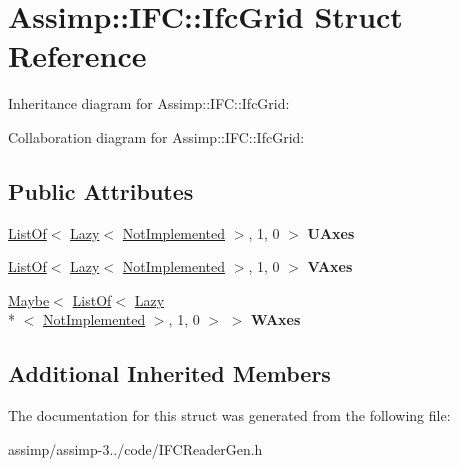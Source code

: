 \hypertarget{struct_assimp_1_1_i_f_c_1_1_ifc_grid}{\section{Assimp\+:\+:I\+F\+C\+:\+:Ifc\+Grid Struct Reference}
\label{struct_assimp_1_1_i_f_c_1_1_ifc_grid}
}


Inheritance diagram for Assimp\+:\+:I\+F\+C\+:\+:Ifc\+Grid\+:


Collaboration diagram for Assimp\+:\+:I\+F\+C\+:\+:Ifc\+Grid\+:
\subsection*{Public Attributes}
\begin{DoxyCompactItemize}
\item 
\hypertarget{struct_assimp_1_1_i_f_c_1_1_ifc_grid_a9d70c4ada02236992a3c54b2bcadb63d}{\hyperlink{struct_assimp_1_1_s_t_e_p_1_1_list_of}{List\+Of}$<$ \hyperlink{struct_assimp_1_1_s_t_e_p_1_1_lazy}{Lazy}$<$ \hyperlink{struct_assimp_1_1_i_f_c_1_1_not_implemented}{Not\+Implemented} $>$, 1, 0 $>$ {\bfseries U\+Axes}}\label{struct_assimp_1_1_i_f_c_1_1_ifc_grid_a9d70c4ada02236992a3c54b2bcadb63d}

\item 
\hypertarget{struct_assimp_1_1_i_f_c_1_1_ifc_grid_a9b6389c4440eca16eb23e5f198e71278}{\hyperlink{struct_assimp_1_1_s_t_e_p_1_1_list_of}{List\+Of}$<$ \hyperlink{struct_assimp_1_1_s_t_e_p_1_1_lazy}{Lazy}$<$ \hyperlink{struct_assimp_1_1_i_f_c_1_1_not_implemented}{Not\+Implemented} $>$, 1, 0 $>$ {\bfseries V\+Axes}}\label{struct_assimp_1_1_i_f_c_1_1_ifc_grid_a9b6389c4440eca16eb23e5f198e71278}

\item 
\hypertarget{struct_assimp_1_1_i_f_c_1_1_ifc_grid_ace15310f115da72fda0b4968c57aea14}{\hyperlink{struct_assimp_1_1_s_t_e_p_1_1_maybe}{Maybe}$<$ \hyperlink{struct_assimp_1_1_s_t_e_p_1_1_list_of}{List\+Of}$<$ \hyperlink{struct_assimp_1_1_s_t_e_p_1_1_lazy}{Lazy}\\*
$<$ \hyperlink{struct_assimp_1_1_i_f_c_1_1_not_implemented}{Not\+Implemented} $>$, 1, 0 $>$ $>$ {\bfseries W\+Axes}}\label{struct_assimp_1_1_i_f_c_1_1_ifc_grid_ace15310f115da72fda0b4968c57aea14}

\end{DoxyCompactItemize}
\subsection*{Additional Inherited Members}


The documentation for this struct was generated from the following file\+:\begin{DoxyCompactItemize}
\item 
assimp/assimp-\/3../code/I\+F\+C\+Reader\+Gen.\+h\end{DoxyCompactItemize}
